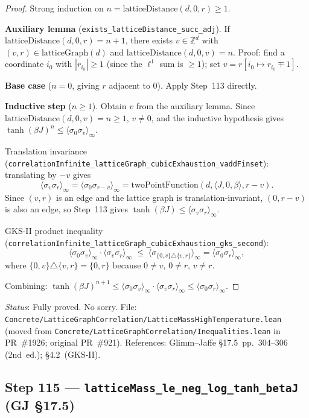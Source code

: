 \documentclass[a4paper,11pt]{article}
\begin{document}
\begin{proof}
Strong induction on $n = \mathrm{latticeDistance}(d,0,r) \ge 1$.

\textbf{Auxiliary lemma} (\texttt{exists\_latticeDistance\_succ\_adj}).
If $\mathrm{latticeDistance}(d,0,r) = n+1$, there exists $v \in \mathbb{Z}^d$ with
$(v,r) \in \mathrm{latticeGraph}(d)$ and $\mathrm{latticeDistance}(d,0,v) = n$.
Proof: find a coordinate $i_0$ with $|r_{i_0}| \ge 1$ (since the $\ell^1$ sum is $\ge 1$);
set $v = r[i_0 \mapsto r_{i_0} \mp 1]$.

\textbf{Base case} ($n = 0$, giving $r$ adjacent to $0$). Apply Step~113 directly.

\textbf{Inductive step} ($n \ge 1$).
Obtain $v$ from the auxiliary lemma.  Since $\mathrm{latticeDistance}(d,0,v) = n \ge 1$, $v \neq 0$,
and the inductive hypothesis gives $\tanh(\beta J)^n \le \langle\sigma_0\sigma_v\rangle_\infty$.

Translation invariance (\texttt{correlationInfinite\_latticeGraph\_cubicExhaustion\_vaddFinset}):
translating by $-v$ gives
\[
  \langle\sigma_v\sigma_r\rangle_\infty
  = \langle\sigma_0\sigma_{r-v}\rangle_\infty
  = \mathrm{twoPointFunction}(d,\langle J,0,\beta\rangle, r-v).
\]
Since $(v,r)$ is an edge and the lattice graph is translation-invariant,
$(0, r-v)$ is also an edge, so Step~113 gives
$\tanh(\beta J) \le \langle\sigma_v\sigma_r\rangle_\infty$.

GKS-II product inequality (\texttt{correlationInfinite\_latticeGraph\_cubicExhaustion\_gks\_second}):
\[
  \langle\sigma_0\sigma_v\rangle_\infty \cdot \langle\sigma_v\sigma_r\rangle_\infty
  \;\le\; \langle\sigma_{\{0,v\}\triangle\{v,r\}}\rangle_\infty
  = \langle\sigma_0\sigma_r\rangle_\infty,
\]
where $\{0,v\}\triangle\{v,r\} = \{0,r\}$ because $0 \neq v$, $0 \neq r$, $v \neq r$.

Combining: $\tanh(\beta J)^{n+1} \le \langle\sigma_0\sigma_v\rangle_\infty \cdot \langle\sigma_v\sigma_r\rangle_\infty \le \langle\sigma_0\sigma_r\rangle_\infty$.
\end{proof}

\noindent\textit{Status}: Fully proved. No sorry.
File: \texttt{Concrete/LatticeGraphCorrelation/LatticeMassHighTemperature.lean} (moved from \texttt{Concrete/LatticeGraphCorrelation/Inequalities.lean} in PR~\#1926; original PR~\#921).
References: Glimm--Jaffe \S17.5~pp.~304--306 (2nd~ed.); \S4.2~(GKS-II).

\subsection*{Step 115 — \texttt{latticeMass\_le\_neg\_log\_tanh\_betaJ} (GJ \S17.5)}
\end{document}
